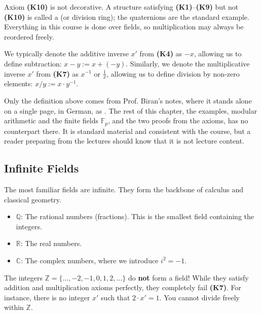 \begin{importantremark}
\label{rem:k10_matters}
Axiom \textbf{(K10)} is not decorative. A structure satisfying \textbf{(K1)}--\textbf{(K9)} but not \textbf{(K10)} is called a  (or division ring); the quaternions are the standard example. Everything in this course is done over fields, so multiplication may always be reordered freely.
\end{importantremark}

\begin{remark}[Notation]
We typically denote the additive inverse $x'$ from \textbf{(K4)} as $-x$, allowing us to define subtraction: $x - y := x + (-y)$. 
Similarly, we denote the multiplicative inverse $x'$ from \textbf{(K7)} as $x^{-1}$ or $\frac{1}{x}$, allowing us to define division by non-zero elements: $x / y := x \cdot y^{-1}$.
\end{remark}

\begin{ainote}
Only the definition above comes from Prof. Biran's notes, where it stands alone
on a single page, in German, as . The rest of this chapter,
the examples, modular arithmetic and the finite fields $\mathbb{F}_p$, and the
two proofs from the axioms, has no counterpart there. It is standard material
and consistent with the course, but a reader preparing from the lectures should
know that it is not lecture content.
\end{ainote}

\subsection{Infinite Fields}

The most familiar fields are infinite. They form the backbone of calculus and classical geometry.

\begin{example}
\begin{itemize}
    \item $\mathbb{Q}$: The rational numbers (fractions). This is the smallest field containing the integers.
    \item $\mathbb{R}$: The real numbers.
    \item $\mathbb{C}$: The complex numbers, where we introduce $i^2 = -1$.
\end{itemize}
\end{example}

\begin{importantremark}
The integers $\mathbb{Z} = \{\dots, -2, -1, 0, 1, 2, \dots\}$ do \textbf{not} form a field! While they satisfy addition and multiplication axioms perfectly, they completely fail \textbf{(K7)}. For instance, there is no integer $x'$ such that $2 \cdot x' = 1$. You cannot divide freely within $\mathbb{Z}$.
\end{importantremark}


